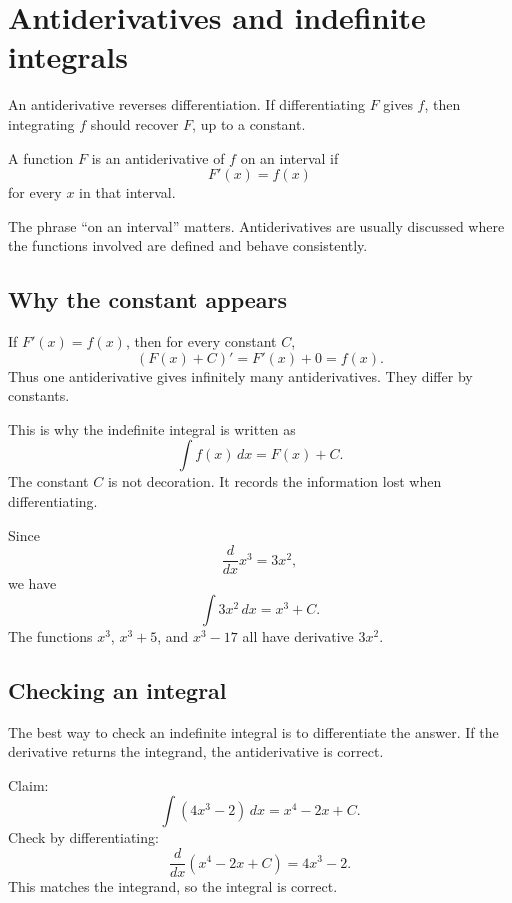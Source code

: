 \section{Antiderivatives and indefinite integrals}

An antiderivative reverses differentiation. If differentiating \(F\) gives \(f\), then integrating \(f\) should recover \(F\), up to a constant.

\begin{definitionbox}
A function \(F\) is an antiderivative of \(f\) on an interval if
\[
F'(x)=f(x)
\]
for every \(x\) in that interval.
\end{definitionbox}

The phrase ``on an interval'' matters. Antiderivatives are usually discussed where the functions involved are defined and behave consistently.

\subsection*{Why the constant appears}

If \(F'(x)=f(x)\), then for every constant \(C\),
\[
(F(x)+C)'=F'(x)+0=f(x).
\]
Thus one antiderivative gives infinitely many antiderivatives. They differ by constants.

This is why the indefinite integral is written as
\[
\int f(x)\,dx=F(x)+C.
\]
The constant \(C\) is not decoration. It records the information lost when differentiating.

\begin{examplebox}
Since
\[
\frac{d}{dx}x^3=3x^2,
\]
we have
\[
\int 3x^2\,dx=x^3+C.
\]
The functions \(x^3\), \(x^3+5\), and \(x^3-17\) all have derivative \(3x^2\).
\end{examplebox}

\subsection*{Checking an integral}

The best way to check an indefinite integral is to differentiate the answer. If the derivative returns the integrand, the antiderivative is correct.

\begin{examplebox}
Claim:
\[
\int (4x^3-2)\,dx=x^4-2x+C.
\]
Check by differentiating:
\[
\frac{d}{dx}(x^4-2x+C)=4x^3-2.
\]
This matches the integrand, so the integral is correct.
\end{examplebox}

